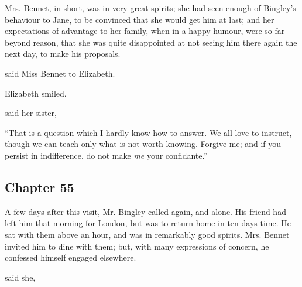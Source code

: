 Mrs. Bennet, in short, was in very great spirits; she had seen enough of Bingley's behaviour to Jane, to be convinced that she would get him at last; and her expectations of advantage to her family, when in a happy humour, were so far beyond reason, that she was quite disappointed at not seeing him there again the next day, to make his proposals.

 said Miss Bennet to Elizabeth. 

Elizabeth smiled.


 said her sister, 




“That is a question which I hardly know how to answer. We all love to instruct, though we can teach only what is not worth knowing. Forgive me; and if you persist in indifference, do not make {\em me} your confidante.”

\subsection[chapter-55]{\useURL[url55][][][]\from[url55] Chapter 55}

A few days after this visit, Mr. Bingley called again, and alone. His friend had left him that morning for London, but was to return home in ten days time. He sat with them above an hour, and was in remarkably good spirits. Mrs. Bennet invited him to dine with them; but, with many expressions of concern, he confessed himself engaged elsewhere.

 said she, 

